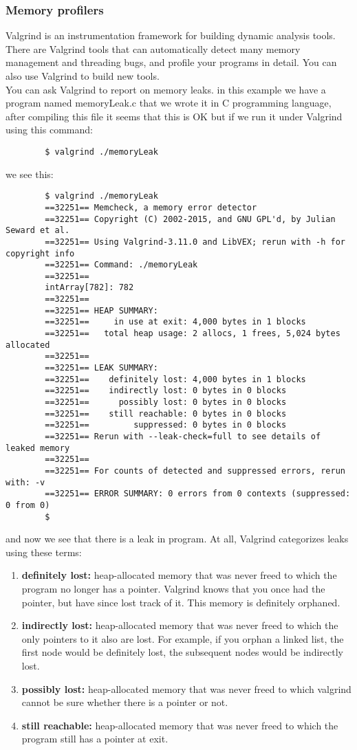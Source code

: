 \documentclass[titlepage]{article}
\begin{document}
	\subsubsection{Memory profilers}
	Valgrind is an instrumentation framework for building dynamic analysis tools. There are Valgrind tools that can automatically detect many memory management and threading bugs, and profile your programs in detail. You can also use Valgrind to build new tools.\\You can ask Valgrind to report on memory leaks. in this example we have a program named memoryLeak.c that we wrote it in C programming language, after compiling this file it seems that this is OK but if we run it under Valgrind using this command:
	\begin{lstlisting}
		$ valgrind ./memoryLeak
	\end{lstlisting}
	we see this:
	\begin{lstlisting}
		$ valgrind ./memoryLeak
		==32251== Memcheck, a memory error detector
		==32251== Copyright (C) 2002-2015, and GNU GPL'd, by Julian Seward et al.
		==32251== Using Valgrind-3.11.0 and LibVEX; rerun with -h for copyright info
		==32251== Command: ./memoryLeak
		==32251== 
		intArray[782]: 782
		==32251== 
		==32251== HEAP SUMMARY:
		==32251==     in use at exit: 4,000 bytes in 1 blocks
		==32251==   total heap usage: 2 allocs, 1 frees, 5,024 bytes allocated
		==32251== 
		==32251== LEAK SUMMARY:
		==32251==    definitely lost: 4,000 bytes in 1 blocks
		==32251==    indirectly lost: 0 bytes in 0 blocks
		==32251==      possibly lost: 0 bytes in 0 blocks
		==32251==    still reachable: 0 bytes in 0 blocks
		==32251==         suppressed: 0 bytes in 0 blocks
		==32251== Rerun with --leak-check=full to see details of leaked memory
		==32251== 
		==32251== For counts of detected and suppressed errors, rerun with: -v
		==32251== ERROR SUMMARY: 0 errors from 0 contexts (suppressed: 0 from 0)
		$
	\end{lstlisting}
	and now we see that there is a leak in program. At all, Valgrind categorizes leaks using these terms:\\
	\begin{enumerate}
		\item \textbf{definitely lost:} heap-allocated memory that was never freed to which the program no longer has a pointer. Valgrind knows that you once had the pointer, but have since lost track of it. This memory is definitely orphaned.
		\item \textbf{indirectly lost:} heap-allocated memory that was never freed to which the only pointers to it also are lost. For example, if you orphan a linked list, the first node would be definitely lost, the subsequent nodes would be indirectly lost.
		\item \textbf{possibly lost:} heap-allocated memory that was never freed to which valgrind cannot be sure whether there is a pointer or not.
		\item \textbf{still reachable:} heap-allocated memory that was never freed to which the program still has a pointer at exit.
	\end{enumerate}
\end{document}
